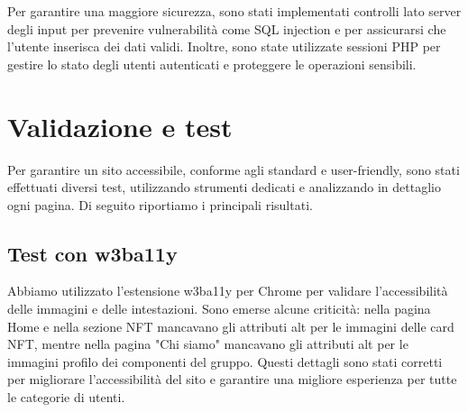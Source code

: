 \documentclass[10pt]{article}
\begin{document}
Per garantire una maggiore sicurezza, sono stati implementati controlli lato server degli input per prevenire vulnerabilità come SQL injection e per assicurarsi che l'utente inserisca dei dati validi. Inoltre, sono state utilizzate sessioni PHP per gestire lo stato degli utenti autenticati e proteggere le operazioni sensibili.

\section{Validazione e test}
Per garantire un sito accessibile, conforme agli standard e user-friendly, sono stati effettuati diversi test, utilizzando strumenti dedicati e analizzando in dettaglio ogni pagina. Di seguito riportiamo i principali risultati.

\subsection{Test con w3ba11y}
Abbiamo utilizzato l’estensione w3ba11y per Chrome per validare l’accessibilità delle immagini e delle intestazioni. Sono emerse alcune criticità: nella pagina Home e nella sezione NFT mancavano gli attributi alt per le immagini delle card NFT, mentre nella pagina "Chi siamo" mancavano gli attributi alt per le immagini profilo dei componenti del gruppo. Questi dettagli sono stati corretti per migliorare l'accessibilità del sito e garantire una migliore esperienza per tutte le categorie di utenti.
\end{document}
